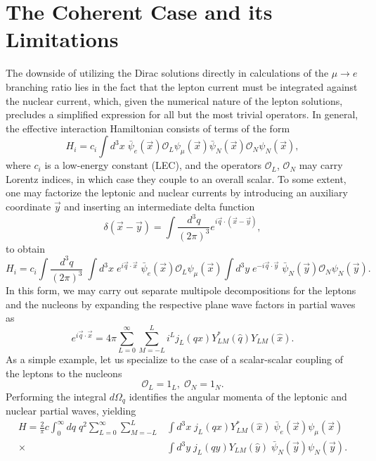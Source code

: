 \documentclass[12pt,letterpaper]{book}
\begin{document}
\section{The Coherent Case and its Limitations}
The downside of utilizing the Dirac solutions directly in calculations of the $\mu\rightarrow e$ branching ratio lies in the fact that the lepton current must be integrated against the nuclear current, which, given the numerical nature of the lepton solutions, precludes a simplified expression for all but the most trivial operators. In general, the effective interaction Hamiltonian consists of terms of the form
\begin{equation}
H_i= c_i \int d^3 x \;\bar{\psi}_e(\vec{x})\mathcal{O}_L\psi_{\mu}(\vec{x})\bar{\psi}_N(\vec{x})\mathcal{O}_N\psi_N(\vec{x}),
\end{equation}
where $c_i$ is a low-energy constant (LEC), and the operators $\mathcal{O}_L$, $\mathcal{O}_N$ may carry Lorentz indices, in which case they couple to an overall scalar. To some extent, one may factorize the leptonic and nuclear currents by introducing an auxiliary  coordinate $\vec{y}$ and inserting an intermediate delta function
\begin{equation}
\delta(\vec{x}-\vec{y})=\int \frac{d^3q}{(2\pi)^3}e^{i\vec{q}\cdot(\vec{x}-\vec{y})},
\end{equation}
to obtain
\begin{equation}
H_i=c_i\int \frac{d^3q}{(2\pi)^3}\;\int d^3x\;e^{i\vec{q}\cdot\vec{x}}\;\bar{\psi}_e(\vec{x})\mathcal{O}_L\psi_\mu(\vec{x})\int d^3y\;e^{-i\vec{q}\cdot\vec{y}}\;\bar{\psi}_N(\vec{y})\mathcal{O}_N\psi_N(\vec{y}).
\end{equation}
In this form, we may carry out separate multipole decompositions for the leptons and the nucleons by expanding the respective plane wave factors in partial waves as
\begin{equation}
e^{i\vec{q}\cdot\vec{x}}=4\pi\sum_{L=0}^{\infty}\sum_{M=-L}^Li^Lj_L(qx)Y_{LM}^*(\hat{q})Y_{LM}(\hat{x}).
\end{equation}
As a simple example, let us specialize to the case of a scalar-scalar coupling of the leptons to the nucleons 
\begin{equation}
\mathcal{O}_L=1_L,\;\mathcal{O}_N=1_N.
\end{equation}
Performing the integral $d\Omega_q$ identifies the angular momenta of the leptonic and nuclear partial waves, yielding
\begin{equation}
\begin{split}
H=\frac{2}{\pi}c\int_0^{\infty}dq\;q^2 \sum_{L=0}^{\infty}\sum_{M=-L}^L&\int d^3x\;j_L(qx)Y^*_{LM}(\hat{x})\;\bar{\psi}_e(\vec{x})\psi_{\mu}(\vec{x})\\
\times&\int d^3y\;j_L(qy)Y_{LM}(\hat{y})\;\bar{\psi}_N(\vec{y})\psi_N(\vec{y}).
\end{split}
\label{eq:H_full_multi}
\end{equation}
\end{document}
